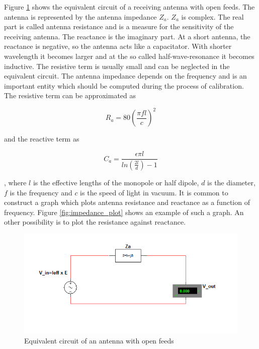 \documentclass[a4paper,11pt]{report}
\begin{document}
Figure \ref{fig:equivalent_open} shows the equivalent circuit of a receiving antenna with open feeds. The antenna is represented by the antenna impedance $Z_a$. $Z_a$ is complex. The real part is called antenna resistance and is a measure for the sensitivity of the receiving antenna. The reactance is the imaginary part. At a short antenna, the reactance is negative, so the antenna acts like a capacitator. With shorter wavelength it becomes larger and at the so called half-wave-resonance it becomes inductive. The resistive term is usually small and can be neglected in the equivalent circuit. The antenna impedance depends on the frequency and is an important entity which should be computed during the process of calibration. The resistive term can be approximated as

\begin{equation}
 R_a=80\left(\frac{\pi f l}{c}\right)^2
\end{equation}
 
and the reactive term as

\begin{equation}
 C_a=\frac{\epsilon \pi l}{ln(\frac{2l}{d})-1}
\end{equation}

\cite{king56}, where $l$ is the effective lengths of the monopole or half dipole, $d$ is the diameter, $f$ is the frequency and $c$ is the speed of light in vacuum. It is common to construct a graph which plots antenna resistance and reactance as a function of frequency. Figure \ref{fig:impedance_plot} shows an example of such a graph. An other possibility is to plot the resistance against reactance.

\begin{figure}
  \noindent\includegraphics[width=12cm]{Ersatzschaltung_openfeed}
\caption{Equivalent circuit of an antenna with open feeds}
\label{fig:equivalent_open}
\end{figure}
\end{document}
